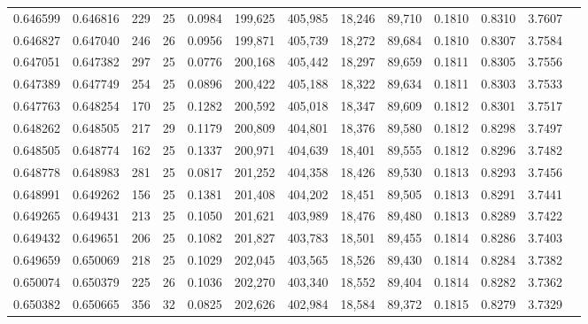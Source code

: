\begin{tabular}{rrrrrrrrrrrrr}
0.646599 & 0.646816 &   229 &  25 &                                     0.0984 & 199,625 & 405,985 &  18,246 &  89,710 & 0.1810 & 0.8310 & 3.7607 \\
0.646827 & 0.647040 &   246 &  26 &                                     0.0956 & 199,871 & 405,739 &  18,272 &  89,684 & 0.1810 & 0.8307 & 3.7584 \\
0.647051 & 0.647382 &   297 &  25 &                                     0.0776 & 200,168 & 405,442 &  18,297 &  89,659 & 0.1811 & 0.8305 & 3.7556 \\
0.647389 & 0.647749 &   254 &  25 &                                     0.0896 & 200,422 & 405,188 &  18,322 &  89,634 & 0.1811 & 0.8303 & 3.7533 \\
0.647763 & 0.648254 &   170 &  25 &                                     0.1282 & 200,592 & 405,018 &  18,347 &  89,609 & 0.1812 & 0.8301 & 3.7517 \\
0.648262 & 0.648505 &   217 &  29 &                                     0.1179 & 200,809 & 404,801 &  18,376 &  89,580 & 0.1812 & 0.8298 & 3.7497 \\
0.648505 & 0.648774 &   162 &  25 &                                     0.1337 & 200,971 & 404,639 &  18,401 &  89,555 & 0.1812 & 0.8296 & 3.7482 \\
0.648778 & 0.648983 &   281 &  25 &                                     0.0817 & 201,252 & 404,358 &  18,426 &  89,530 & 0.1813 & 0.8293 & 3.7456 \\
0.648991 & 0.649262 &   156 &  25 &                                     0.1381 & 201,408 & 404,202 &  18,451 &  89,505 & 0.1813 & 0.8291 & 3.7441 \\
0.649265 & 0.649431 &   213 &  25 &                                     0.1050 & 201,621 & 403,989 &  18,476 &  89,480 & 0.1813 & 0.8289 & 3.7422 \\
0.649432 & 0.649651 &   206 &  25 &                                     0.1082 & 201,827 & 403,783 &  18,501 &  89,455 & 0.1814 & 0.8286 & 3.7403 \\
0.649659 & 0.650069 &   218 &  25 &                                     0.1029 & 202,045 & 403,565 &  18,526 &  89,430 & 0.1814 & 0.8284 & 3.7382 \\
0.650074 & 0.650379 &   225 &  26 &                                     0.1036 & 202,270 & 403,340 &  18,552 &  89,404 & 0.1814 & 0.8282 & 3.7362 \\
0.650382 & 0.650665 &   356 &  32 &                                     0.0825 & 202,626 & 402,984 &  18,584 &  89,372 & 0.1815 & 0.8279 & 3.7329 \\

\end{tabular}
